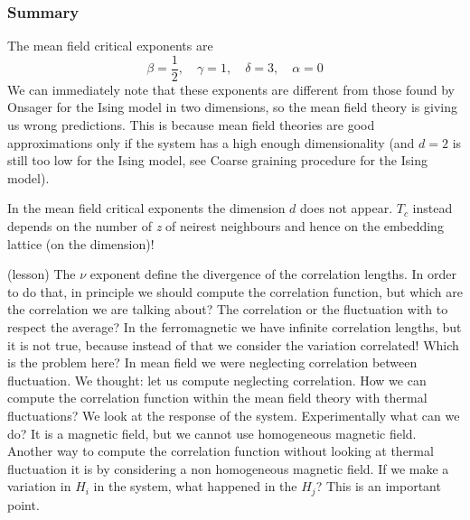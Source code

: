 \documentclass[../main/main.tex]{subfiles}
\begin{document}
\subsubsection{Summary}
The mean field critical exponents are
\begin{equation}
  \beta = \frac{1}{2}, \quad \gamma =1, \quad \delta =3, \quad \alpha =0
\end{equation}
We can immediately note that these exponents are different from those found by Onsager for the Ising model in two dimensions, so the mean field theory is giving us wrong predictions. This is because mean field theories are good approximations only if the system has a high enough dimensionality (and \(d=2\) is still too low for the Ising model, see Coarse graining procedure for the Ising model).
\begin{remark}
In the mean field critical exponents the dimension \( d \) does not appear. \( T_c \) instead depends on the number of \emph{z} of neirest neighbours and hence on the embedding lattice (on the dimension)!
\end{remark}
\begin{remark}
  (lesson)
  The \( \nu  \) exponent define the divergence of the correlation lengths. In order to do that, in principle we should compute the correlation function, but which are the correlation we are talking about? The correlation or the fluctuation with to respect the average? In the ferromagnetic we have infinite correlation lengths, but it is not true, because instead of that we consider the variation correlated!
  Which is the problem here? In mean field we were neglecting correlation between fluctuation.
  We thought: let us compute neglecting correlation.
  How we can compute the correlation function within the mean field theory with thermal fluctuations? We look at the response of the system. Experimentally what can we do? It is a magnetic field, but we cannot use homogeneous magnetic field. Another way to compute the correlation function without looking at thermal fluctuation it is by considering a non homogeneous magnetic field.
  If we make a variation in \( H_i \) in the system, what happened in the \( H_j \)? This is an important point.
\end{remark}
\end{document}
